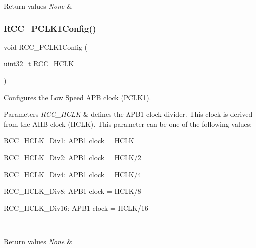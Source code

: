 \begin{DoxyRetVals}{Return values}
{\em None} & \\
\hline
\end{DoxyRetVals}
\mbox{\label{group___r_c_c___exported___functions_ga448137346d4292985d4e7a61dd1a824f}} 
\subsubsection{\texorpdfstring{RCC\_PCLK1Config()}{RCC\_PCLK1Config()}}
{\footnotesize\ttfamily void R\+C\+C\+\_\+\+P\+C\+L\+K1\+Config (\begin{DoxyParamCaption}\item[{uint32\+\_\+t}]{R\+C\+C\+\_\+\+H\+C\+LK }\end{DoxyParamCaption})}



Configures the Low Speed A\+PB clock (P\+C\+L\+K1). 


\begin{DoxyParams}{Parameters}
{\em R\+C\+C\+\_\+\+H\+C\+LK} & defines the A\+P\+B1 clock divider. This clock is derived from the A\+HB clock (H\+C\+LK). This parameter can be one of the following values\+: \begin{DoxyItemize}
\item R\+C\+C\+\_\+\+H\+C\+L\+K\+\_\+\+Div1\+: A\+P\+B1 clock = H\+C\+LK \item R\+C\+C\+\_\+\+H\+C\+L\+K\+\_\+\+Div2\+: A\+P\+B1 clock = H\+C\+L\+K/2 \item R\+C\+C\+\_\+\+H\+C\+L\+K\+\_\+\+Div4\+: A\+P\+B1 clock = H\+C\+L\+K/4 \item R\+C\+C\+\_\+\+H\+C\+L\+K\+\_\+\+Div8\+: A\+P\+B1 clock = H\+C\+L\+K/8 \item R\+C\+C\+\_\+\+H\+C\+L\+K\+\_\+\+Div16\+: A\+P\+B1 clock = H\+C\+L\+K/16 \end{DoxyItemize}
\\
\hline
\end{DoxyParams}

\begin{DoxyRetVals}{Return values}
{\em None} & \\
\hline
\end{DoxyRetVals}
\mbox{\label{group___r_c_c___exported___functions_ga09f9c010a4adca9e036da42c2ca6126a}} 
